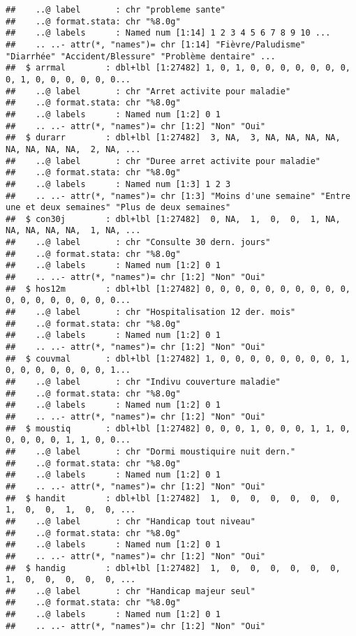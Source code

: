\documentclass[
]{article}
\begin{document}
\begin{verbatim}
##    ..@ label       : chr "probleme sante"
##    ..@ format.stata: chr "%8.0g"
##    ..@ labels      : Named num [1:14] 1 2 3 4 5 6 7 8 9 10 ...
##    .. ..- attr(*, "names")= chr [1:14] "Fièvre/Paludisme" "Diarrhée" "Accident/Blessure" "Problème dentaire" ...
##  $ arrmal        : dbl+lbl [1:27482] 1, 0, 1, 0, 0, 0, 0, 0, 0, 0, 0, 1, 0, 0, 0, 0, 0, 0...
##    ..@ label       : chr "Arret activite pour maladie"
##    ..@ format.stata: chr "%8.0g"
##    ..@ labels      : Named num [1:2] 0 1
##    .. ..- attr(*, "names")= chr [1:2] "Non" "Oui"
##  $ durarr        : dbl+lbl [1:27482]  3, NA,  3, NA, NA, NA, NA, NA, NA, NA, NA,  2, NA, ...
##    ..@ label       : chr "Duree arret activite pour maladie"
##    ..@ format.stata: chr "%8.0g"
##    ..@ labels      : Named num [1:3] 1 2 3
##    .. ..- attr(*, "names")= chr [1:3] "Moins d'une semaine" "Entre une et deux semaines" "Plus de deux semaines"
##  $ con30j        : dbl+lbl [1:27482]  0, NA,  1,  0,  0,  1, NA, NA, NA, NA, NA,  1, NA, ...
##    ..@ label       : chr "Consulte 30 dern. jours"
##    ..@ format.stata: chr "%8.0g"
##    ..@ labels      : Named num [1:2] 0 1
##    .. ..- attr(*, "names")= chr [1:2] "Non" "Oui"
##  $ hos12m        : dbl+lbl [1:27482] 0, 0, 0, 0, 0, 0, 0, 0, 0, 0, 0, 0, 0, 0, 0, 0, 0, 0...
##    ..@ label       : chr "Hospitalisation 12 der. mois"
##    ..@ format.stata: chr "%8.0g"
##    ..@ labels      : Named num [1:2] 0 1
##    .. ..- attr(*, "names")= chr [1:2] "Non" "Oui"
##  $ couvmal       : dbl+lbl [1:27482] 1, 0, 0, 0, 0, 0, 0, 0, 0, 1, 0, 0, 0, 0, 0, 0, 0, 1...
##    ..@ label       : chr "Indivu couverture maladie"
##    ..@ format.stata: chr "%8.0g"
##    ..@ labels      : Named num [1:2] 0 1
##    .. ..- attr(*, "names")= chr [1:2] "Non" "Oui"
##  $ moustiq       : dbl+lbl [1:27482] 0, 0, 0, 1, 0, 0, 0, 1, 1, 0, 0, 0, 0, 0, 1, 1, 0, 0...
##    ..@ label       : chr "Dormi moustiquire nuit dern."
##    ..@ format.stata: chr "%8.0g"
##    ..@ labels      : Named num [1:2] 0 1
##    .. ..- attr(*, "names")= chr [1:2] "Non" "Oui"
##  $ handit        : dbl+lbl [1:27482]  1,  0,  0,  0,  0,  0,  0,  1,  0,  0,  1,  0,  0, ...
##    ..@ label       : chr "Handicap tout niveau"
##    ..@ format.stata: chr "%8.0g"
##    ..@ labels      : Named num [1:2] 0 1
##    .. ..- attr(*, "names")= chr [1:2] "Non" "Oui"
##  $ handig        : dbl+lbl [1:27482]  1,  0,  0,  0,  0,  0,  0,  1,  0,  0,  0,  0,  0, ...
##    ..@ label       : chr "Handicap majeur seul"
##    ..@ format.stata: chr "%8.0g"
##    ..@ labels      : Named num [1:2] 0 1
##    .. ..- attr(*, "names")= chr [1:2] "Non" "Oui"

\end{verbatim}
\end{document}
